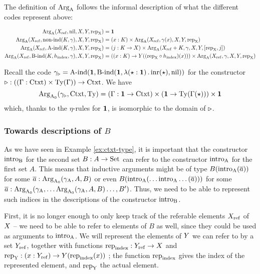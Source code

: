 \documentclass{article}
\begin{document}
The definition of $\text{Arg}_{\mathrm{A}}$ follows the informal description of what the
different codes represent above:

\begin{align*} 
  \text{Arg}_{\mathrm{A}}(X_{\mathrm{ref}}, \text{nil}, X, Y, \text{rep}_{\mathrm{X}}) &= \mathbf{1} \\
  \text{Arg}_{\mathrm{A}}(X_{\mathrm{ref}}, \text{non-ind}(K, \gamma), X, Y, \text{rep}_{\mathrm{X}}) &= (x : K) \times \text{Arg}_{\mathrm{A}}(X_{\mathrm{ref}}, \gamma(x), X, Y, \text{rep}_{\mathrm{X}}) \\
  \text{Arg}_{\mathrm{A}}(X_{\mathrm{ref}}, \text{A-ind}(K, \gamma), X, Y, \text{rep}_{\mathrm{X}}) &=  (j : K \to X) \times \text{Arg}_{\mathrm{A}}(X_{\mathrm{ref}} + K, \gamma, X, Y, [\text{rep}_{\mathrm{X}}, j]) \\
  \text{Arg}_{\mathrm{A}}(X_{\mathrm{ref}}, \text{B-ind}(K, h_{\mathrm{index}}, \gamma), X, Y, \text{rep}_{\mathrm{X}}) &=  ((x : K) \to Y((\text{rep}_{\mathrm{X}} \circ h_{\mathrm{index}})(x))) \times \text{Arg}_{\mathrm{A}}(X_{\mathrm{ref}}, \gamma, X, Y, \text{rep}_{\mathrm{X}}) \\
\end{align*}

\begin{example}
  Recall the code $\gamma_{\triangleright} = \text{A-ind}(\mathbf{1}, \text{B-ind}(\mathbf{1},
  \lambda (\star : \mathbf{1})\,.\,\text{inr}(\star), \text{nil}))$ for the
  constructor $\triangleright : ((\Gamma : \text{Ctxt}) \times \text{Ty}(\Gamma)) \to
  \text{Ctxt}$. We have 
\[
\text{Arg}_{\mathrm{A}_0}(\gamma_{\triangleright}, \text{Ctxt}, \text{Ty}) = (\Gamma : \mathbf{1} \to \text{Ctxt})
\times (\mathbf{1} \to \text{Ty}(\Gamma(\star))) \times \mathbf{1}
\]
which, thanks to the $\eta$-rules for $\mathbf{1}$, is isomorphic to the
domain of $\triangleright$. 
\blackqed
\end{example}

\subsubsection{Towards descriptions of $B$} %
\label{sec:towards-SPB}

As we have seen in Example \ref{ex:ctxt-type}, it is important that
the constructor $\text{intro}_{\mathrm{B}}$ for the second set $B : A \to \text{Set}$ can
refer to the constructor $\text{intro}_{\mathrm{A}}$ for the first set $A$. This means
that inductive arguments might be of type $B(\text{intro}_{\mathrm{A}}(\overline{a}))$
for some $\overline{a} : \text{Arg}_{\mathrm{A}_0}(\gamma_{\mathrm{A}}, A, B)$ or even
$B(\text{intro}_{\mathrm{A}}(\ldots\text{intro}_{\mathrm{A}}\ldots(\overline{a})))$ for some $\overline{a}
: \text{Arg}_{\mathrm{A}_0}(\gamma_{\mathrm{A}}, \ldots \text{Arg}_{\mathrm{A}_0}(\gamma_{\mathrm{A}}, A, B)\ldots, B')$. Thus, we
need to be able to represent such indices in the descriptions of the
constructor $\text{intro}_{\mathrm{B}}$.

First, it is no longer enough to only keep track of the referable
elements $X_{\mathrm{ref}}$ of $X$ -- we need to be able to refer to elements of
$B$ as well, since they could be used as arguments to $\text{intro}_{\mathrm{A}}$. We
will represent the elements of $Y$ we can refer to by a set $Y_{\mathrm{ref}}$,
together with functions $\text{rep}_{\mathrm{index}} : Y_{\mathrm{ref}} \to X$ and $\text{rep}_{\mathrm{Y}} : (x :
Y_{\mathrm{ref}}) \to Y(\text{rep}_{\mathrm{index}}(x))$ ; the function $\text{rep}_{\mathrm{index}}$ gives the index
of the represented element, and $\text{rep}_{\mathrm{Y}}$ the actual element.
\end{document}
